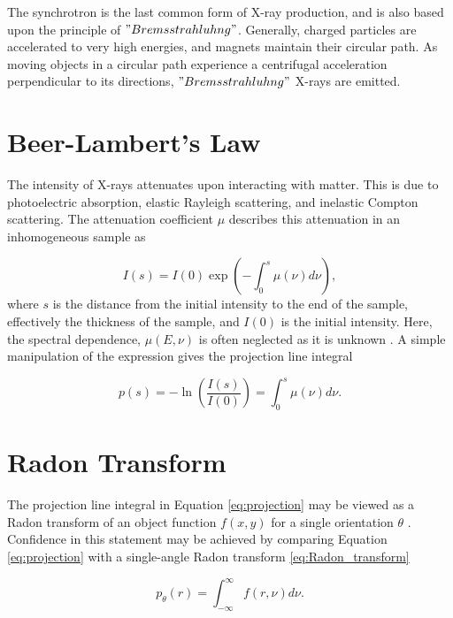 The synchrotron is the last common form of X-ray production, and is also based upon the principle of $"Bremsstrahluhng"$. Generally, charged particles are accelerated to very high energies, and magnets maintain their circular path. As moving objects in a circular path experience a centrifugal acceleration perpendicular to its directions, $"Bremsstrahluhng"$ X-rays are emitted. 

\section{Beer-Lambert's Law}
The intensity of X-rays attenuates upon interacting with matter. This is due to photoelectric absorption, elastic Rayleigh scattering, and inelastic Compton scattering. The attenuation coefficient $\mu$ describes this attenuation in an inhomogeneous sample as

\begin{equation}
    I(s) = I(0) \exp(- \int_{0}^{s} \mu(\nu) d\nu),
\end{equation}
\noindent
where $s$ is the distance from the initial intensity to the end of the sample, effectively the thickness of the sample, and $I(0)$ is the initial intensity. Here, the spectral dependence, $\mu(E,\nu)$ is often neglected as it is unknown \cite{buzug2009computed}. A simple manipulation of the expression gives the projection line integral

\begin{equation}\label{eq:projection}
    p(s) = -\ln(\frac{I(s)}{I(0)} ) = \int_{0}^{s} \mu(\nu) d\nu.
\end{equation}

\section{Radon Transform}
The projection line integral in Equation \eqref{eq:projection} may be viewed as a Radon transform of an object function $f(x,y)$ for a single orientation $\theta$ \cite{zeng2010medical}. Confidence in this statement may be achieved by comparing Equation \eqref{eq:projection} with a single-angle Radon transform \eqref{eq:Radon_transform}

\begin{equation}\label{eq:Radon_transform}
    p_{\theta}(r) = \int_{-\infty}^{\infty} f(r,\nu) d\nu.
\end{equation}

